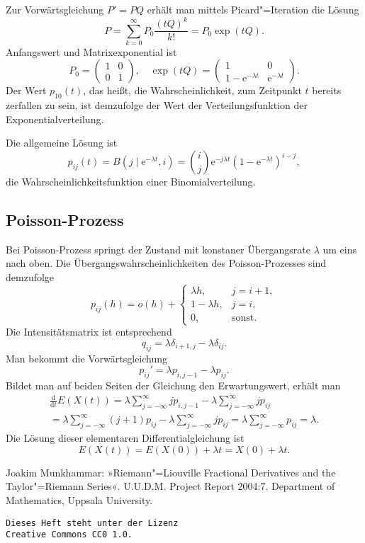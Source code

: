 \documentclass[a4paper,10pt,fleqn,twocolumn,twoside,dvipdfmx]{scrartcl}
\numberwithin{equation}{section}
\newcommand{\ee}{\mathrm e}
\theoremstyle{rmbox}
\begin{document}
Zur Vorwärtsgleichung $P' = PQ$ erhält man mittels
Picard"=Iteration die Lösung%
\[P = \sum_{k=0}^\infty P_0\frac{(tQ)^k}{k!} = P_0\exp(tQ).\]
Anfangswert und Matrixexponential ist
\[P_0 = \begin{pmatrix}
1 & 0\\
0 & 1
\end{pmatrix},\quad
\exp(tQ) = \begin{pmatrix}
1 & 0\\
1-\ee^{-\lambda t} & \ee^{-\lambda t}
\end{pmatrix}.\]
Der Wert $p_{10}(t)$, das heißt, die Wahrscheinlichkeit,
zum Zeitpunkt $t$ bereits zerfallen zu sein, ist demzufolge der Wert
der Verteilungsfunktion der Exponentialverteilung.

Die allgemeine Lösung ist
\[p_{ij}(t) = B(j\mid \ee^{-\lambda t},i)
= \binom{i}{j}\ee^{-j\lambda t}(1-\ee^{-\lambda t})^{i-j},\]
die Wahrscheinlichkeitsfunktion einer Binomialverteilung.

\subsection{Poisson-Prozess}

Bei Poisson-Prozess springt der Zustand mit konstaner
Übergangsrate $\lambda$ um eins nach oben. Die
Übergangswahrscheinlichkeiten des Poisson-Prozesses sind demzufolge
\[p_{ij}(h) = o(h) + \begin{cases}
\lambda h, & j=i+1,\\
1-\lambda h, & j=i,\\
0, & \text{sonst}.
\end{cases}\]
Die Intensitätsmatrix ist entsprechend
\[q_{ij} = \lambda\delta_{i+1,j} - \lambda\delta_{ij}.\]
Man bekommt die Vorwärtsgleichung
\[p_{ij}' = \lambda p_{i,j-1} - \lambda p_{ij}.\]
Bildet man auf beiden Seiten der Gleichung den Erwartungswert,
erhält man%
\begin{gather*}
\frac{\mathrm d}{\mathrm dt}E(X(t))
= \lambda\sum_{j=-\infty}^\infty jp_{i,j-1}
- \lambda\sum_{j=-\infty}^\infty jp_{ij}\\
= \lambda\sum_{j=-\infty}^\infty (j+1)p_{ij}
- \lambda\sum_{j=-\infty}^\infty jp_{ij}
= \lambda\sum_{j=-\infty}^\infty p_{ij} = \lambda.
\end{gather*}
Die Lösung dieser elementaren Differentialgleichung ist%
\[E(X(t)) = E(X(0)) + \lambda t = X(0) + \lambda t.\]

\begin{thebibliography}{x}
\bibitem{} Joakim Munkhammar: »Riemann"=Liouville Fractional Derivatives
and the Taylor"=Riemann Series«. U.U.D.M. Project Report 2004:7.
Department of Mathematics, Uppsala University.
\end{thebibliography}

\vfill\noindent
\texttt{Dieses Heft steht unter der Lizenz\\
Creative Commons CC0 1.0.}
\end{document}
